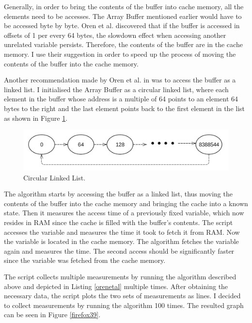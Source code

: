 \documentclass[10pt,a4paper,twoside]{book}
\begin{document}
Generally, in order to bring the contents of the buffer into cache memory, all the elements need to be accesses. The Array Buffer mentioned earlier would have to be accessed byte by byte. Oren et al. discovered that if the buffer is accessed in offsets of 1 per every 64 bytes, the slowdown effect when accessing another unrelated variable persists. Therefore, the contents of the buffer are in the cache memory. I use their suggestion in order to speed up the process of moving the contents of the buffer into the cache memory.

Another recommendation made by Oren et al. in \cite{oren2015spy} was to access the buffer as a linked list. I initialised the Array Buffer as a circular linked list, where each element in the buffer whose address is a multiple of 64 points to an element 64 bytes to the right and the last element points back to the first element in the list as shown in Figure \ref{circularlinkedlist}.

\begin{figure}[h]
\centering
\includegraphics[width=\textwidth]{figures/circularlinkedlist.png}
\caption{Circular Linked List.}
\label{circularlinkedlist}
\end{figure}

The algorithm starts by accessing the buffer as a linked list, thus moving the contents of the buffer into the cache memory and bringing the cache into a known state. Then it measures the access time of a previously fixed variable, which now resides in RAM since the cache is filled with the buffer's contents. The script accesses the variable and measures the time it took to fetch it from RAM. Now the variable is located in the cache memory. The algorithm fetches the variable again and measures the time. The second access should be significantly faster since the variable was fetched from the cache memory.

The script collects multiple measurements by running the algorithm described above and depicted in Listing \ref{orenetal} multiple times. After obtaining the necessary data, the script plots the two sets of measurements as lines. I decided to collect measurements by running the algorithm 100 times. The resulted graph can be seen in Figure \ref{firefox39}.
\end{document}
